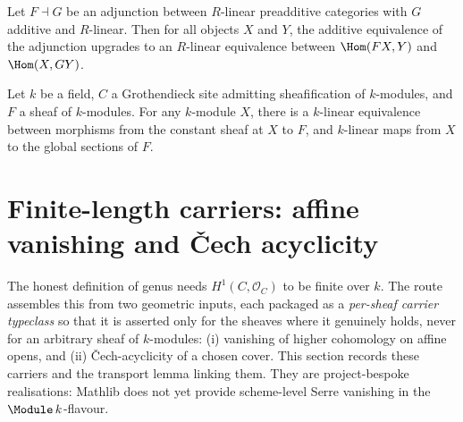 \begin{theorem}
  \label{def:Adjunction_homLinearEquiv}
  
  Let \(F \dashv G\) be an adjunction between \(R\)-linear preadditive categories with \(G\) additive and \(R\)-linear. Then for all objects \(X\) and \(Y\), the additive equivalence of the adjunction upgrades to an \(R\)-linear equivalence between \(\Hom(FX, Y)\) and \(\Hom(X, GY)\).
\end{theorem}

\begin{theorem}
  \label{def:Scheme_constantSheafGammaHom_linearEquiv}
  Let \(k\) be a field, \(C\) a Grothendieck site admitting sheafification of \(k\)-modules, and \(F\) a sheaf of \(k\)-modules. For any \(k\)-module \(X\), there is a \(k\)-linear equivalence between morphisms from the constant sheaf at \(X\) to \(F\), and \(k\)-linear maps from \(X\) to the global sections of \(F\).
\end{theorem}

\section{Finite-length carriers: affine vanishing and \v{C}ech acyclicity}
\label{sec:moduleK_carriers}

The honest definition of genus needs \(H^1(C, \mathcal O_C)\) to be finite over \(k\). The route assembles this from two geometric inputs, each packaged as a \emph{per-sheaf carrier typeclass} so that it is asserted only for the sheaves where it genuinely holds, never for an arbitrary sheaf of \(k\)-modules: (i) vanishing of higher cohomology on affine opens, and (ii) \v{C}ech-acyclicity of a chosen cover. This section records these carriers and the transport lemma linking them. They are project-bespoke realisations: Mathlib does not yet provide scheme-level Serre vanishing in the \(\Module\, k\)-flavour.

